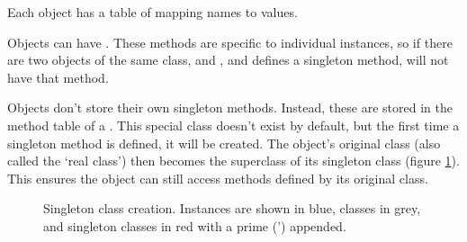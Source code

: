 Each object has a table of  mapping names to values.

Objects can have . These methods are specific to individual instances, so if there are two objects of the same class,  and , and  defines a singleton method,  will not have that method.

Objects don't store their own singleton methods. Instead, these are stored in the method table of a . This special class doesn't exist by default, but the first time a singleton method is defined, it will be created. The object's original class (also called the `real class') then becomes the superclass of its singleton class (figure \ref{fig:singleton_class_creation}). This ensures the object can still access methods defined by its original class.

\begin{figure}
\begin{center}
\caption{Singleton class creation. Instances are shown in blue, classes in grey, and singleton classes in red with a prime (') appended.}
\label{fig:singleton_class_creation}
\end{center}
\end{figure}

